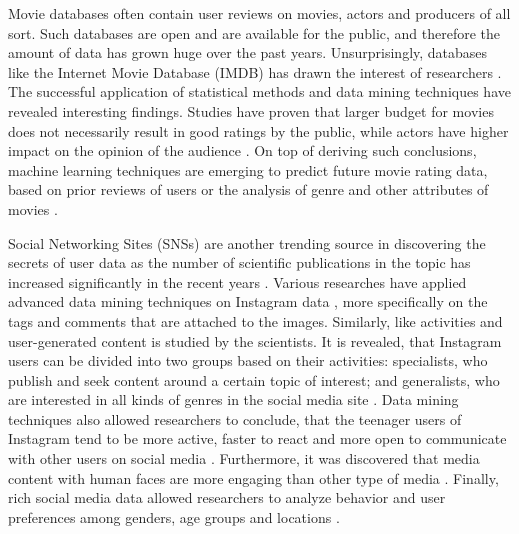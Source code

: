 Movie databases often contain user reviews on movies, actors and producers of all sort. Such databases are open and are available for the public, and therefore the amount of data has grown huge over the past years. Unsurprisingly, databases like the Internet Movie Database (IMDB) has drawn the interest of researchers \cite{saraee2004data, kabinsingha2012movie, sumathi2013performance}. The successful application of statistical methods and data mining techniques have revealed interesting findings. Studies have proven that larger budget for movies does not necessarily result in good ratings by the public, while actors have higher impact on the opinion of the audience \cite{saraee2004data}. On top of deriving such conclusions, machine learning techniques are emerging to predict future movie rating data, based on prior reviews of users \cite{saraee2004data} or the analysis of genre and other attributes of movies \cite{kabinsingha2012movie}.

Social Networking Sites (SNSs) are another trending source in discovering the secrets of user data as the number of scientific publications in the topic has increased significantly in the recent years \cite{waheed2017investigation}. Various researches have applied advanced data mining techniques on Instagram data \cite{jang2015noreciprocity, bakhshi2014faces, hu2014we, jang2016teensengagemorewithfewerphotos, han2016teensarefrommars}, more specifically on the tags and comments that are attached to the images. Similarly, like activities and user-generated content is studied by the scientists. It is revealed, that Instagram users can be divided into two groups based on their activities: specialists, who publish and seek content around a certain topic of interest; and generalists, who are interested in all kinds of genres in the social media site \cite{jang2015noreciprocity}. Data mining techniques also allowed researchers to conclude, that the teenager users of Instagram tend to be more active, faster to react and more open to communicate with other users on social media \cite{jang2016teensengagemorewithfewerphotos, han2016teensarefrommars}. Furthermore, it was discovered that media content with human faces are more engaging than other type of media \cite{bakhshi2014faces}. Finally, rich social media data allowed researchers to analyze behavior and user preferences among genders, age groups and locations \cite{farseev2015harvestingmultiplesources}.

